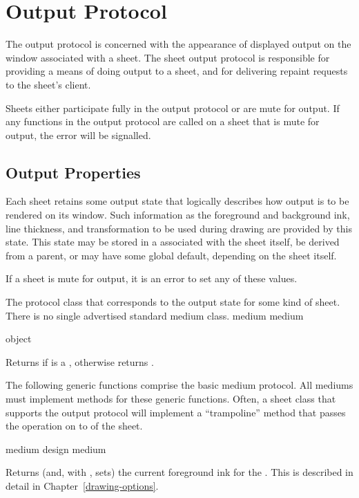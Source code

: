 \section {Output Protocol}

The output protocol is concerned with the appearance of displayed output on the
window associated with a sheet.  The sheet output protocol is responsible for
providing a means of doing output to a sheet, and for delivering repaint
requests to the sheet's client.

Sheets either participate fully in the output protocol or are mute for output.
If any functions in the output protocol are called on a sheet that is mute for
output, the  error will be signalled.


\subsection {Output Properties}

Each sheet retains some output state that logically describes how output is to
be rendered on its window.  Such information as the foreground and background
ink, line thickness, and transformation to be used during drawing are provided
by this state.  This state may be stored in a  associated with
the sheet itself, be derived from a parent, or may have some global default,
depending on the sheet itself.

If a sheet is mute for output, it is an error to set any of these values.


The protocol class that corresponds to the output state for some kind of sheet.
There is no single advertised standard medium class.
 {medium} {medium}

 {object}

Returns  if  is a , otherwise returns
.

The following generic functions comprise the basic medium protocol.  All mediums
must implement methods for these generic functions.  Often, a sheet class that
supports the output protocol will implement a ``trampoline'' method that passes
the operation on to  of the sheet.

 {medium}
 {design medium}

Returns (and, with , sets) the current foreground ink for the
 . This is described in detail in
Chapter~\ref{drawing-options}.

